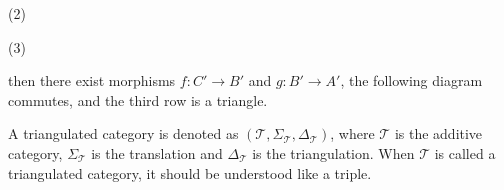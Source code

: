 \begin{definition}
\begin{enumerate}
\begin{center}
                    (2)

                    (3)
                \end{center}
                then there exist morphisms $f : C' \rightarrow B'$ and $g : B' \rightarrow A'$, the following diagram commutes, and the third row is a triangle.

                \begin{center}
                \end{center}
        \end{enumerate}
    \end{definition}

    A triangulated category is denoted as $(\mathcal{T}, \Sigma_{\mathcal{T}}, \Delta_{\mathcal{T}})$, where $\mathcal{T}$ is the additive category, $\Sigma_{\mathcal{T}}$ is the translation and $\Delta_{\mathcal{T}}$ is the triangulation. When $\mathcal{T}$ is called a triangulated category, it should be understood like a triple.
    
